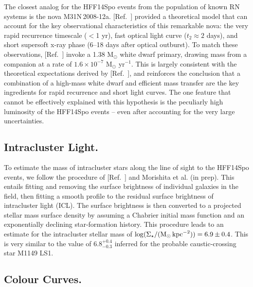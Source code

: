\documentclass{article}
\newcommand{\citeref}[1]{[Ref.~{\citenum{#1}}]}
\providecommand\citep{\cite}
\def\Msun{\mbox{M$_{\odot}$}\xspace}
\def\spock{HFF14Spo\xspace}
\def\t2{\ensuremath{t_{2}}\xspace}
\begin{document}
The closest analog for the \spock events from the population of known
RN systems is the nova M31N\,2008-12a.  \citeref{Kato:2015} provided a
theoretical model that can account for the key observational
characteristics of this remarkable nova: the very rapid recurrence
timescale ($<$1 yr), fast optical light curve ($\t2\approx2$ days), and
short supersoft x-ray phase (6--18 days after optical
  outburst)\citep{Henze:2015a}.  To match these observations,
\citeref{Kato:2015} invoke a 1.38 \Msun white dwarf primary,
drawing mass from a companion at a rate of $1.6\times10^{-7}$ \Msun
yr$^{-1}$.  This is largely consistent with the theoretical
expectations derived by \citeref{Yaron:2005}, and reinforces the
conclusion that a combination of a high-mass white dwarf and efficient
mass transfer are the key ingredients for rapid recurrence and short
light curves. The one feature that cannot be effectively explained
with this hypothesis is the peculiarly high luminosity of the \spock
events -- even after accounting for the very large uncertainties. 

\subsection{Intracluster Light.}\label{sec:ICL}

To estimate the mass of intracluster stars along the line of sight to
the \spock events, we follow the procedure of \citeref{Kelly:2017} and
Morishita et al. (in prep).  This entails fitting and removing the
surface brightness of individual galaxies in the field, then fitting a
smooth profile to the residual surface brightness of intracluster
light (ICL).  The surface brightness is then converted to a projected
stellar mass surface density by assuming a
Chabrier\cite{Chabrier:2003} initial mass function and an
exponentially declining star-formation history.  This procedure leads
to an estimate for the intracluster stellar mass of $\log
(\Sigma_{\star} / (\Msun\,{\rm kpc}^{-2})) = 6.9\pm0.4$.  This is
very similar to the value of $6.8^{+0.4}_{-0.3}$ inferred for the
probable caustic-crossing star M1149 LS1\cite{Kelly:2017}.


\subsection{Colour Curves.}\label{sec:ColorCurves}

\end{document}
